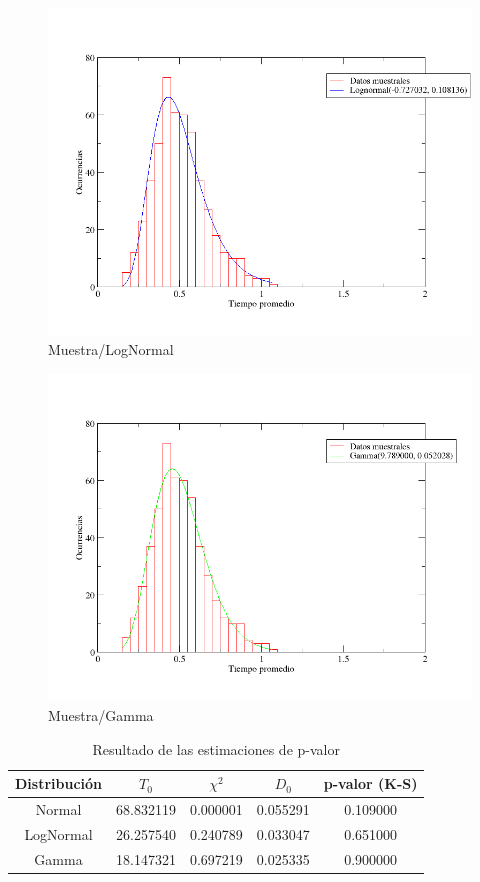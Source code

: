 \documentclass[10pt,a4paper]{article}
\begin{document}
\begin{figure}
  \centering
  \includegraphics[scale=0.5]{freq-lognormal.png} 
  \caption{Muestra/LogNormal}
  \label{freq-lognormal}
\end{figure}

\begin{figure}
  \centering
  \includegraphics[scale=0.5]{freq-gamma.png} 
  \caption{Muestra/Gamma}
  \label{freq-gamma}
\end{figure}

\begin{table}[ht]
\caption{Resultado de las estimaciones de p-valor}
\centering
\begin{tabular}{c c c c c}
\hline\hline
Distribuci\'on & $T_0$ & $\chi^2$ & $D_0$ & p-valor (K-S)\\ [0.5ex]
\hline
Normal & 68.832119 & 0.000001 & 0.055291 & 0.109000 \\
LogNormal & 26.257540 & 0.240789 & 0.033047 & 0.651000 \\
Gamma & 18.147321 & 0.697219 & 0.025335 & 0.900000 \\
\hline
\end{tabular}
\label{estimators}
\end{table}
\end{document}
